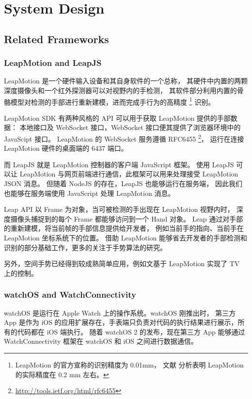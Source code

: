 \chapter{System Design}

\section{Related Frameworks}

\subsection{LeapMotion and LeapJS}

LeapMotion \cite{Leap:2016}是一个硬件输入设备和其自身软件的一个总称，
其硬件中内置的两颗深度摄像头和一个红外探测器可以对视野内的手检测，
其软件部分利用内置的骨骼模型对检测的手部进行重新建模，进而完成手行为的高精度
\footnote{ LeapMotion 的官方宣称的识别精度为 0.01mm，
文献\cite{weichert2013analysis, gdu2016} 分析表明 LeapMotion 的实际精度在 0.2 mm 左右。}
识别。

LeapMotion SDK 有两种风格的 API 可以用于获取 LeapMotion 提供的手部数据：
本地接口及 WebSocket 接口，WebSocket 接口便其提供了浏览器环境中的 JavaScipt 接口。
LeapMotion 的 WebSocket 服务遵循 RFC6455
\footnote{\url{http://tools.ietf.org/html/rfc6455}}，
运行在连接 LeapMotion 硬件的桌面端的 6437 端口。

而 LeapJS 就是 LeapMotion 控制器的客户端 JavaScript 框架。
使用 LeapJS 可以让 LeapMotion 与网页前端进行通信，此框架可以用来处理接受 LeapMotion JSON 消息。
但随着 NodeJS 的存在，LeapJS 也能够运行在服务端，
因此我们也能够在服务端使用 JavaScript 处理 LeapMotion 消息。

Leap API 以 Frame 为对象，当可被检测的手出现在 LeapMotion 视野内时，
深度摄像头捕捉到的每个 Frame 都能够访问到一个 Hand 对象。
Leap 通过对手部的重新建模，将当前帧的手部信息提供给开发者，
例如当前手的指向、当前手在 LeapMotion 坐标系统下的位置。
借助 LeapMotion 能够省去开发者的手部检测和识别的部分基础工作，更多的关注于手势算法的研究\cite{garber2013gestural,xusuibin2015,panjiajia2015,huhong2015,marin2014hand}。

另外，空间手势已经得到较成熟简单应用，例如文\cite{zaicti2015free}基于 LeapMotion 实现了 TV 上的控制。

\subsection{watchOS and WatchConnectivity}

watchOS 是运行在 Apple Watch 上的操作系统。watchOS 刚推出时，
第三方 App 是作为 iOS 的应用扩展存在，手表端只负责对代码的执行结果进行展示，所有的代码都在 iOS 端执行。
随着 watchOS 2 的发布，现在第三方 App 能够通过 WatchConnectivity 框架在 watchOS 和 iOS 之间进行数据通信。

